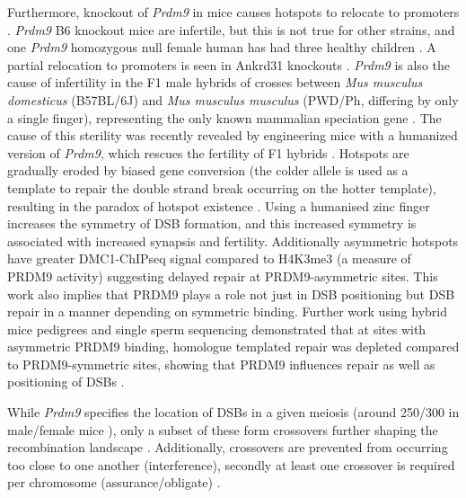 Furthermore, knockout of \textit{Prdm9} in mice causes hotspots to relocate to promoters \parencite{Brick2012Genetic}. \textit{Prdm9} B6 knockout mice are infertile, but this is not true for other strains, and one \textit{Prdm9} homozygous null female human has had three healthy children \parencite{Hayashi2005histone, Mihola2019Histone, Narasimhan2016Health}. A partial relocation to promoters is seen in Ankrd31 knockouts \parencite{Boekhout2019REC114, Papanikos2018ANKRD31}. \textit{Prdm9} is also the cause of infertility in the F1 male hybrids of crosses between \textit{Mus musculus domesticus} (B57BL/6J) and \textit{Mus musculus musculus} (PWD/Ph, differing by only a single finger), representing the only known mammalian speciation gene \parencite{Forejt1974Genetic, Mihola2009Mouse}. The cause of this sterility was recently revealed by engineering mice with a humanized version of \textit{Prdm9}, which rescues the fertility of F1 hybrids \parencite{Davies2016Reengineering}. Hotspots are gradually eroded by biased gene conversion (the colder allele is used as a template to repair the double strand break occurring on the hotter template), resulting in the paradox of hotspot existence \parencite{Boulton1997hotspot, Coop2007Live, Myers2010Drive, Baker2015PRDM9}. Using a humanised zinc finger increases the symmetry of DSB formation, and this increased symmetry is associated with increased synapsis and fertility. Additionally asymmetric hotspots have greater DMC1-ChIPseq signal compared to H4K3me3 (a measure of PRDM9 activity) suggesting delayed repair at PRDM9-asymmetric sites. This work also implies that PRDM9 plays a role not just in DSB positioning but DSB repair in a manner depending on symmetric binding. Further work using hybrid mice pedigrees and single sperm sequencing demonstrated that at sites with asymmetric PRDM9 binding, homologue templated repair was depleted compared to PRDM9-symmetric sites, showing that PRDM9 influences repair as well as positioning of DSBs \parencite{Li2019highresolution, Hinch2019Factors}.

While \textit{Prdm9} specifies the location of DSBs in a given meiosis (around 250/300 in male/female mice \parencite{Baudat2007Regulating}), only a subset of these form crossovers further shaping the recombination landscape \parencite{Youds2011choice}. Additionally, crossovers are prevented from occurring too close to one another (interference), secondly at least one crossover is required per chromosome (assurance/obligate) \parencite{Fledel-Alon2009BroadScale, Hunter2015Meiotic, Otto2019Crossover}.



